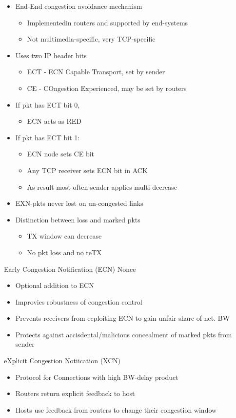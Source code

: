\begin{itemize}
	\item End-End congestion avoidance mechanism
	\begin{itemize}
		\item Implementedin routers and supported by end-systems
		\item Not multimedia-specific, very TCP-specific
	\end{itemize}
	\item Uses two IP header bits
	\begin{itemize}
		\item ECT - ECN Capable Transport, set by sender
		\item CE - COngestion Experienced, may be set by routers
	\end{itemize}
	\item If pkt has ECT bit 0,
	\begin{itemize}
		\item ECN acts as RED
	\end{itemize}
	\item If pkt has ECT bit 1:
	\begin{itemize}
		\item ECN node sets CE bit
		\item Any TCP receiver sets ECN bit in ACK
		\item As result most often sender applies multi decrease
	\end{itemize}
	\item EXN-pkts never lost on un-congested links
	\item Distinction between loss and marked pkts
	\begin{itemize}
		\item TX window can decrease
		\item No pkt loss and no reTX
	\end{itemize}
\end{itemize}
Early Congestion Notification (ECN) Nonce
\begin{itemize}
	\item Optional addition to ECN
	\item Improvies robustness of congestion control
	\item Prevents receivers from ecploiting ECN to gain unfair share of
		net. BW
	\item Protects against accisdental/malicious concealment of marked pkts
		from sender
\end{itemize}
eXplicit Congestion Notiication (XCN)
\begin{itemize}
	\item Protocol for Connections with high BW-delay product
	\item Routers return explicit feedback to host
	\item Hosts use feedback from routers to change their congestion window
\end{itemize}
